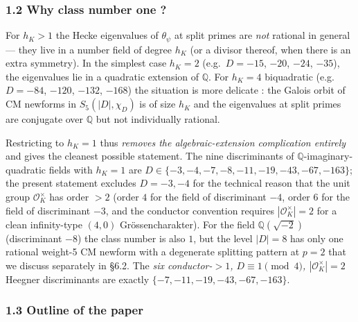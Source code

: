 \documentclass[
  11pt,
  a4paper,
]{amsart}
\begin{document}
\hypertarget{why-class-number-one}{%
\subsubsection{1.2 Why class number one ?}\label{why-class-number-one}}

For \(h_K > 1\) the Hecke eigenvalues of \(\theta_\psi\) at split primes are \emph{not} rational in general --- they live in a number field of degree \(h_K\) (or a divisor thereof, when there is an extra symmetry). In the simplest case \(h_K = 2\) (e.g.~\(D = -15\), \(-20\), \(-24\), \(-35\)), the eigenvalues lie in a quadratic extension of \(\mathbb{Q}\). For \(h_K = 4\) biquadratic (e.g.~\(D = -84\), \(-120\), \(-132\), \(-168\)) the situation is more delicate : the Galois orbit of CM newforms in \(S_5(|D|, \chi_D)\) is of size \(h_K\) and the eigenvalues at split primes are conjugate over \(\mathbb{Q}\) but not individually rational.

Restricting to \(h_K = 1\) thus \emph{removes the algebraic-extension complication entirely} and gives the cleanest possible statement. The nine discriminants of \(\mathbb{Q}\)-imaginary-quadratic fields with \(h_K = 1\) are \(D \in \{-3, -4, -7, -8, -11, -19, -43, -67, -163\}\); the present statement excludes \(D = -3, -4\) for the technical reason that the unit group \(\mathcal{O}_K^\times\) has order \(> 2\) (order \(4\) for the field of discriminant \(-4\), order \(6\) for the field of discriminant \(-3\), and the conductor convention requires \(|\mathcal{O}_K^\times| = 2\) for a clean infinity-type \((4, 0)\) Grössencharakter). For the field \(\mathbb{Q}(\sqrt{-2})\) (discriminant \(-8\)) the class number is also \(1\), but the level \(|D| = 8\) has only one rational weight-5 CM newform with a degenerate splitting pattern at \(p = 2\) that we discuss separately in §6.2. The \emph{six conductor-\(> 1\), \(D \equiv 1 \pmod 4\), \(|\mathcal{O}_K^\times| = 2\)} Heegner discriminants are exactly \(\{-7, -11, -19, -43, -67, -163\}\).

\hypertarget{outline-of-the-paper}{%
\subsubsection{1.3 Outline of the paper}\label{outline-of-the-paper}}
\end{document}
